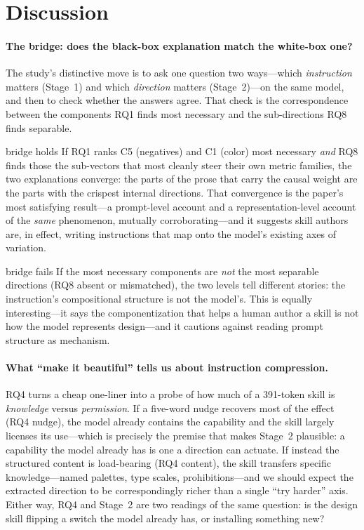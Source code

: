 \section{Discussion}
\label{sec:discussion}

\paragraph{The bridge: does the black-box explanation match the white-box one?} The study's
distinctive move is to ask one question two ways---which \emph{instruction} matters (Stage~1) and
which \emph{direction} matters (Stage~2)---on the same model, and then to check whether the answers
agree. That check is the correspondence between the components RQ1 finds most necessary and the
sub-directions RQ8 finds separable.
\begin{resultbranch}{bridge holds}
If RQ1 ranks C5 (negatives) and C1 (color) most necessary \emph{and} RQ8 finds those the sub-vectors
that most cleanly steer their own metric families, the two explanations converge: the parts of the
prose that carry the causal weight are the parts with the crispest internal directions. That
convergence is the paper's most satisfying result---a prompt-level account and a
representation-level account of the \emph{same} phenomenon, mutually corroborating---and it suggests
skill authors are, in effect, writing instructions that map onto the model's existing axes of
variation.
\end{resultbranch}
\begin{resultbranch}{bridge fails}
If the most necessary components are \emph{not} the most separable directions (RQ8 absent or
mismatched), the two levels tell different stories: the instruction's compositional structure is not
the model's. This is equally interesting---it says the componentization that helps a human author a
skill is not how the model represents design---and it cautions against reading prompt structure as
mechanism.
\end{resultbranch}

\paragraph{What ``make it beautiful'' tells us about instruction compression.} RQ4 turns a cheap
one-liner into a probe of how much of a 391-token skill is \emph{knowledge} versus \emph{permission}.
If a five-word nudge recovers most of the effect (RQ4 nudge), the model already contains the
capability and the skill largely licenses its use---which is precisely the premise that makes Stage~2
plausible: a capability the model already has is one a direction can actuate. If instead the
structured content is load-bearing (RQ4 content), the skill transfers specific
knowledge---named palettes, type scales, prohibitions---and we should expect the extracted direction
to be correspondingly richer than a single ``try harder'' axis. Either way, RQ4 and Stage~2 are two
readings of the same question: is the design skill flipping a switch the model already has, or
installing something new?

